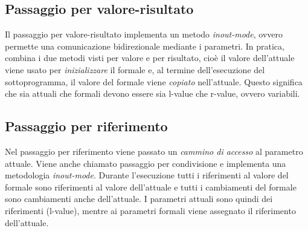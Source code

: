 \documentclass[a4paper,oneside,titlepage]{book}
\begin{document}
\subsection{Passaggio per valore-risultato}
Il passaggio per valore-risultato implementa un metodo \textit{inout-mode}, ovvero permette una comunicazione bidirezionale mediante i parametri. In pratica, combina i due metodi visti per valore e per risultato, cioè il valore dell'attuale viene usato per \textit{inizializzare} il formale e, al termine dell'esecuzione del sottoprogramma, il valore del formale viene \textit{copiato} nell'attuale. Questo significa che sia attuali che formali devono essere sia l-value che r-value, ovvero variabili.

\subsection{Passaggio per riferimento}
Nel passaggio per riferimento viene passato un \textit{cammino di accesso} al parametro attuale. Viene anche chiamato passaggio per condivisione e implementa una metodologia \textit{inout-mode}. Durante l'esecuzione tutti i riferimenti al valore del formale sono riferimenti al valore dell'attuale e tutti i cambiamenti del formale sono cambiamenti anche dell'attuale. I parametri attuali sono quindi dei riferimenti (l-value), mentre ai parametri formali viene assegnato il riferimento dell'attuale.
\end{document}
